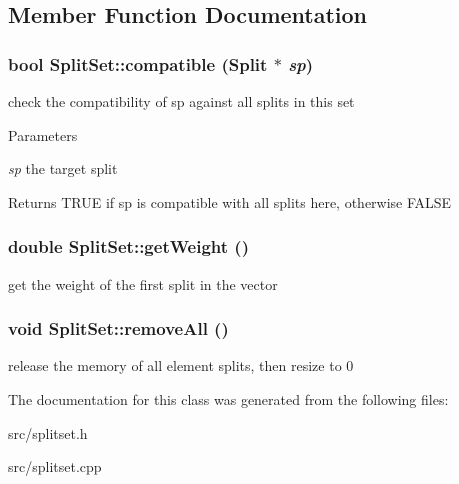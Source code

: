 \subsection{Member Function Documentation}
\hypertarget{classSplitSet_a4f71eb2dc2d5fd83a17680a539c0afe6}{
\subsubsection[{compatible}]{\setlength{\rightskip}{0pt plus 5cm}bool SplitSet::compatible ({\bf Split} $\ast$ {\em sp})}}
\label{classSplitSet_a4f71eb2dc2d5fd83a17680a539c0afe6}
check the compatibility of sp against all splits in this set 
\begin{DoxyParams}{Parameters}
\item[{\em sp}]the target split \end{DoxyParams}
\begin{DoxyReturn}{Returns}
TRUE if sp is compatible with all splits here, otherwise FALSE 
\end{DoxyReturn}
\hypertarget{classSplitSet_ac1eced61b59973480c01fec6ad6ee7b5}{
\subsubsection[{getWeight}]{\setlength{\rightskip}{0pt plus 5cm}double SplitSet::getWeight ()}}
\label{classSplitSet_ac1eced61b59973480c01fec6ad6ee7b5}
get the weight of the first split in the vector \hypertarget{classSplitSet_a6d18de51f6ef06b6f507f911a07468dc}{
\subsubsection[{removeAll}]{\setlength{\rightskip}{0pt plus 5cm}void SplitSet::removeAll ()}}
\label{classSplitSet_a6d18de51f6ef06b6f507f911a07468dc}
release the memory of all element splits, then resize to 0 

The documentation for this class was generated from the following files:\begin{DoxyCompactItemize}
\item 
src/splitset.h\item 
src/splitset.cpp\end{DoxyCompactItemize}
